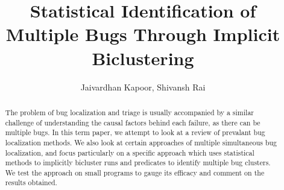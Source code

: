 \documentclass[a4paper,10pt, margin=0.75in]{article}
\title{Statistical Identification of Multiple Bugs Through Implicit Biclustering}
\author{Jaivardhan Kapoor, Shivansh Rai}
\begin{document}
\maketitle

\begin{abstract}
    The problem of bug localization and triage is usually accompanied by a similar challenge of understanding the causal factors behind each failure, as there can be multiple bugs. In this term paper, we attempt to look at a review of prevalant bug localization methods. We also look at certain approaches of multiple simultaneous bug localization, and focus particularly on a specific approach which uses statistical methods to implicitly bicluster runs and predicates to identify multiple bug clusters. We test the approach on small programs to gauge its efficacy and comment on the results obtained.
\end{abstract}
\end{document}
